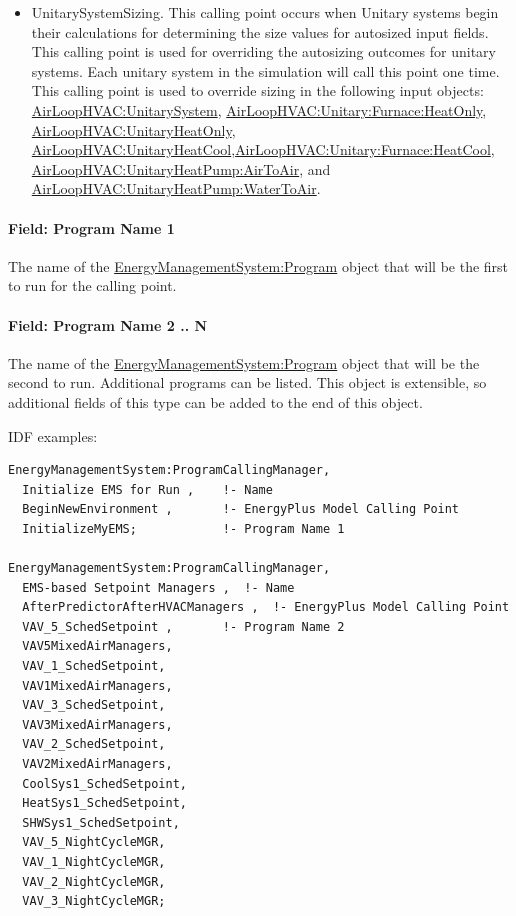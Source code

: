 \begin{itemize}
\item
  UnitarySystemSizing. This calling point occurs when Unitary systems begin their calculations for determining the size values for autosized input fields. This calling point is used for overriding the autosizing outcomes for unitary systems. Each unitary system in the simulation will call this point one time. This calling point is used to override sizing in the following input objects: \hyperref[airloophvacunitarysystem]{AirLoopHVAC:UnitarySystem}, \hyperref[airloophvacunitaryfurnaceheatonly]{AirLoopHVAC:Unitary:Furnace:HeatOnly}, \hyperref[airloophvacunitaryheatonly]{AirLoopHVAC:UnitaryHeatOnly}, \hyperref[airloophvacunitaryheatcool]{AirLoopHVAC:UnitaryHeatCool},\hyperref[airloophvacunitaryfurnaceheatcool]{AirLoopHVAC:Unitary:Furnace:HeatCool}, \hyperref[airloophvacunitaryheatpumpairtoair]{AirLoopHVAC:UnitaryHeatPump:AirToAir}, and \hyperref[airloophvacunitaryheatpumpwatertoair]{AirLoopHVAC:UnitaryHeatPump:WaterToAir}.
\end{itemize}

\paragraph{Field: Program Name 1}\label{field-program-name-1}

The name of the \hyperref[energymanagementsystemprogram]{EnergyManagementSystem:Program} object that will be the first to run for the calling point.

\paragraph{Field: Program Name 2 .. N}\label{field-program-name-2-..-n}

The name of the \hyperref[energymanagementsystemprogram]{EnergyManagementSystem:Program} object that will be the second to run. Additional programs can be listed. This object is extensible, so additional fields of this type can be added to the end of this object.

IDF examples:

\begin{lstlisting}
EnergyManagementSystem:ProgramCallingManager,
  Initialize EMS for Run ,    !- Name
  BeginNewEnvironment ,       !- EnergyPlus Model Calling Point
  InitializeMyEMS;            !- Program Name 1

EnergyManagementSystem:ProgramCallingManager,
  EMS-based Setpoint Managers ,  !- Name
  AfterPredictorAfterHVACManagers ,  !- EnergyPlus Model Calling Point
  VAV_5_SchedSetpoint ,       !- Program Name 2
  VAV5MixedAirManagers,
  VAV_1_SchedSetpoint,
  VAV1MixedAirManagers,
  VAV_3_SchedSetpoint,
  VAV3MixedAirManagers,
  VAV_2_SchedSetpoint,
  VAV2MixedAirManagers,
  CoolSys1_SchedSetpoint,
  HeatSys1_SchedSetpoint,
  SHWSys1_SchedSetpoint,
  VAV_5_NightCycleMGR,
  VAV_1_NightCycleMGR,
  VAV_2_NightCycleMGR,
  VAV_3_NightCycleMGR;
\end{lstlisting}

